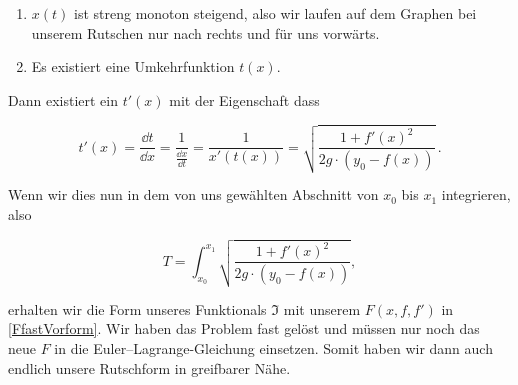 \begin{enumerate}
 \item $x(t)$ ist streng monoton steigend, also wir laufen auf dem Graphen bei unserem Rutschen nur nach rechts und für uns vorwärts.
 \item Es existiert eine Umkehrfunktion $t(x)$.
\end{enumerate}

Dann existiert ein $t'(x)$ mit der Eigenschaft dass

\begin{equation} \label{FfastVorform}
 t'(x)= \frac{\dd t}{\dd x} 
 = \frac{1}{\frac{\dd x}{\dd t}}=\frac{1}{x'(t(x))}
 = \sqrt{\frac{1+f'(x)^2}{2g \cdot (y_0 - f(x))}}\,.
\end{equation}

Wenn wir dies nun in dem von uns gewählten Abschnitt von $x_0$ bis $x_1$ integrieren, also

\begin{equation}\label{FIntegriert}
 T=\int_{x_0}^{x_1} \sqrt{\frac{1+f'(x)^2}{2g \cdot (y_0 - f(x))}},
\end{equation}

erhalten wir die Form unseres Funktionals $\mathfrak{I}$ mit unserem $F(x,f,f')$ in \ref{FfastVorform}.
Wir haben das Problem fast gelöst und müssen nur noch das neue $F$ in die Euler--Lagrange-Gleichung einsetzen.
Somit haben wir dann auch endlich unsere Rutschform in greifbarer Nähe. 




